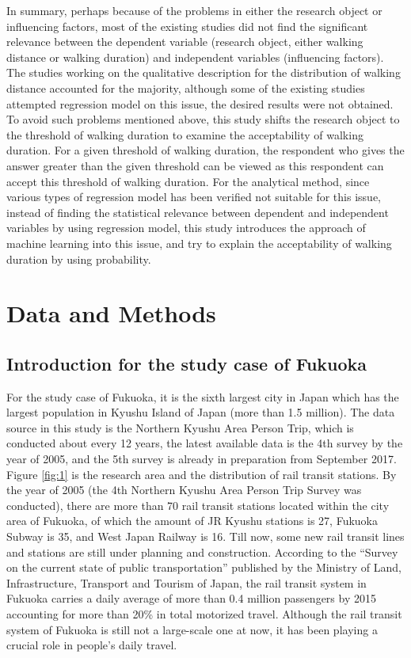 \documentclass[Journal,letterpaper]{ascelike-new}
\begin{document}
%
In summary, perhaps because of the problems in either the research object or influencing factors, most of the existing studies did not find the significant relevance between the dependent variable (research object, either walking distance or walking duration) and independent variables (influencing factors). The studies working on the qualitative description for the distribution of walking distance accounted for the majority, although some of the existing studies attempted regression model on this issue, the desired results were not obtained. To avoid such problems mentioned above, this study shifts the research object to the threshold of walking duration to examine the acceptability of walking duration. For a given threshold of walking duration, the respondent who gives the answer greater than the given threshold can be viewed as this respondent can accept this threshold of walking duration. For the analytical method, since various types of regression model has been verified not suitable for this issue, instead of finding the statistical relevance between dependent and independent variables by using regression model, this study introduces the approach of machine learning into this issue, and try to explain the acceptability of walking duration by using probability.

%
\section{Data and Methods}

%
\subsection{Introduction for the study case of Fukuoka}
For the study case of Fukuoka, it is the sixth largest city in Japan which has the largest population in Kyushu Island of Japan (more than 1.5 million). The data source in this study is the Northern Kyushu Area Person Trip, which is conducted about every 12 years, the latest available data is the 4th survey by the year of 2005, and the 5th survey is already in preparation from September 2017. Figure \ref{fig:1} is the research area and the distribution of rail transit stations. By the year of 2005 (the 4th Northern Kyushu Area Person Trip Survey was conducted), there are more than 70 rail transit stations located within the city area of Fukuoka, of which the amount of JR Kyushu stations is 27, Fukuoka Subway is 35, and West Japan Railway is 16. Till now, some new rail transit lines and stations are still under planning and construction. According to the “Survey on the current state of public transportation” published by the Ministry of Land, Infrastructure, Transport and Tourism of Japan, the rail transit system in Fukuoka carries a daily average of more than 0.4 million passengers by 2015 accounting for more than 20\% in total motorized travel. Although the rail transit system of Fukuoka is still not a large-scale one at now, it has been playing a crucial role in people's daily travel.
\end{document}
